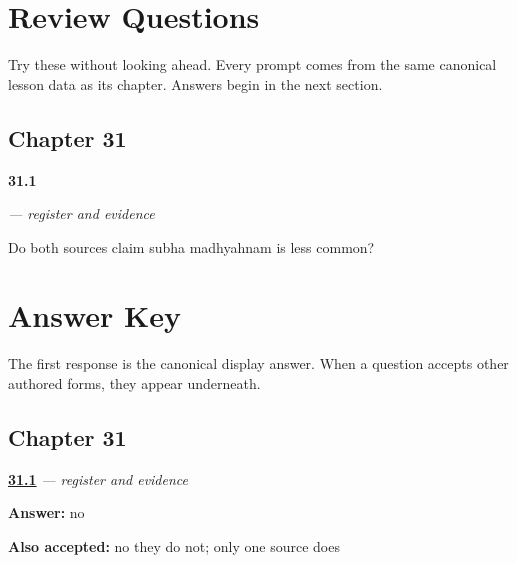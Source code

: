 
\chapter*{Review Questions}

Try these without looking ahead. Every prompt comes from the same canonical lesson data as its chapter. Answers begin in the next section.

\section*{Chapter 31}

\noindent\begin{minipage}[t]{\linewidth}
\raggedright
\hypertarget{review-TE-C31-subha-madhyahnam-register-source-scope}{\textbf{31.1}} \emph{  — register and evidence}\par
\small Do both sources claim subha madhyahnam is less common?
\end{minipage}\par\medskip

\chapter*{Answer Key}

The first response is the canonical display answer. When a question accepts other authored forms, they appear underneath.

\section*{Chapter 31}

\noindent\begin{minipage}[t]{\linewidth}
\raggedright
\hyperlink{review-TE-C31-subha-madhyahnam-register-source-scope}{\textbf{31.1}} \emph{  — register and evidence}\par
\small \textbf{Answer:} no\par
\footnotesize \textbf{Also accepted:} no they do not; only one source does
\end{minipage}\par\medskip
